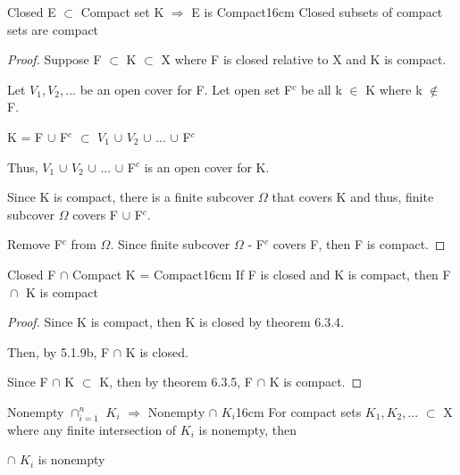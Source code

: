 	\begin{wtheorem}{Closed E $\subset$ Compact set K
	$\Rightarrow$ E is Compact}{16cm}
		Closed subsets of compact sets are compact
	\end{wtheorem}
	
	\begin{proof}
		Suppose F $\subset$ K $\subset$ X where F is closed relative to X
		and K is compact.

		Let $V_1, V_2, ...$ be an open cover for F.
		Let open set F$^c$ be all k $\in$ K where k $\not \in$ F.

		\qquad K = F $\cup$ F$^c$ $\subset$ $V_1$ $\cup$ $V_2$ $\cup$ ... $\cup$ F$^c$

		Thus, $V_1$ $\cup$ $V_2$ $\cup$ ... $\cup$ F$^c$ is an open cover for K.

		Since K is compact, there is a finite subcover $\Omega$ that covers K
		and thus, finite subcover $\Omega$ covers F $\cup$ F$^c$.
		
		Remove F$^c$ from $\Omega$. Since finite subcover $\Omega$ - F$^c$ covers F,
		then F is compact.
	\end{proof}

	 \vspace{0.5cm}



	 \begin{corollary}{Closed F $\cap$ Compact K = Compact}{16cm}
		If F is closed and K is compact, then F $\cap_{}^{}$ K is compact 
	 \end{corollary}
	 
	 \begin{proof}
		Since K is compact, then K is closed by {\color{red} theorem 6.3.4}.

		Then, by {\color{red} 5.1.9b}, F $\cap$ K is closed.

		Since F $\cap$ K $\subset$ K, then by {\color{red} theorem 6.3.5},
		F $\cap$ K is compact. 
	 \end{proof}

	\newpage


	
	\begin{wtheorem}{Nonempty $\cap_{i=1}^n$ $K_i$ $\Rightarrow$
	Nonempty $\cap$ $K_i$}{16cm}
		For compact sets $K_1, K_2, ...$ $\subset$ X where any finite intersection
		of $K_i$ is nonempty, then
		
		$\cap$ $K_i$ is nonempty		
	\end{wtheorem}
	
